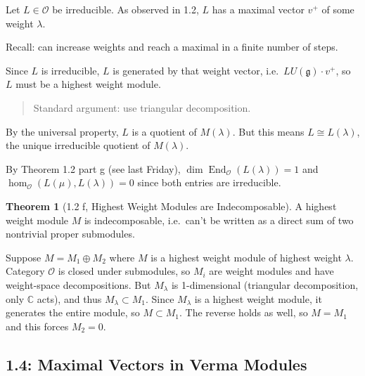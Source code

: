 \documentclass[11pt]{scrartcl}
\theoremstyle{definition}
\theoremstyle{theorem}
\newtheorem{theorem}{Theorem}[section]
\theoremstyle{proof}
\newenvironment{proof}
{\pushQED{$\qed$}\pf}
{\par\popQED\endpf}
\theoremstyle{definition}
\theoremstyle{break}
\theoremstyle{problem}
\def\endo{\operatorname{End}}
\newcommand{\CC}[0]{{\mathbb{C}}}
\newcommand{\lieg}[0]{{\mathfrak{g}}}
\newcommand{\OO}[0]{{\mathcal{O}}}
\renewcommand{\qed}[0]{\hfill\blacksquare}
\begin{document}
\begin{proof}

Let \(L \in \OO\) be irreducible. As observed in 1.2, \(L\) has a
maximal vector \(v^+\) of some weight \(\lambda\).

Recall: can increase weights and reach a maximal in a finite number of
steps.

Since \(L\) is irreducible, \(L\) is generated by that weight vector,
i.e.~\(L U(\lieg) \cdot v^+\), so \(L\) must be a highest weight module.

\begin{quote}
Standard argument: use triangular decomposition.
\end{quote}

By the universal property, \(L\) is a quotient of \(M(\lambda)\). But
this means \(L \cong L(\lambda)\), the unique irreducible quotient of
\(M(\lambda)\).

By Theorem 1.2 part g (see last Friday),
\(\dim \endo_\OO(L(\lambda)) = 1\) and
\(\hom_\OO(L(\mu), L(\lambda)) = 0\) since both entries are
irreducible.\end{proof}

\begin{theorem}[1.2 f, Highest Weight Modules are Indecomposable]

A highest weight module \(M\) is indecomposable, i.e.~can't be written
as a direct sum of two nontrivial proper submodules.\end{theorem}

\begin{proof}[of Theorem 1.2 f]

Suppose \(M = M_1 \oplus M_2\) where \(M\) is a highest weight module of
highest weight \(\lambda\). Category \(\OO\) is closed under submodules,
so \(M_i\) are weight modules and have weight-space decompositions. But
\(M_\lambda\) is 1-dimensional (triangular decomposition, only \(\CC\)
acts), and thus \(M_\lambda \subset M_1\). Since \(M_\lambda\) is a
highest weight module, it generates the entire module, so
\(M \subset M_1\). The reverse holds as well, so \(M = M_1\) and this
forces \(M_2 = 0\).\end{proof}

\hypertarget{maximal-vectors-in-verma-modules}{%
\subsection{1.4: Maximal Vectors in Verma
Modules}\label{maximal-vectors-in-verma-modules}}
\end{document}
